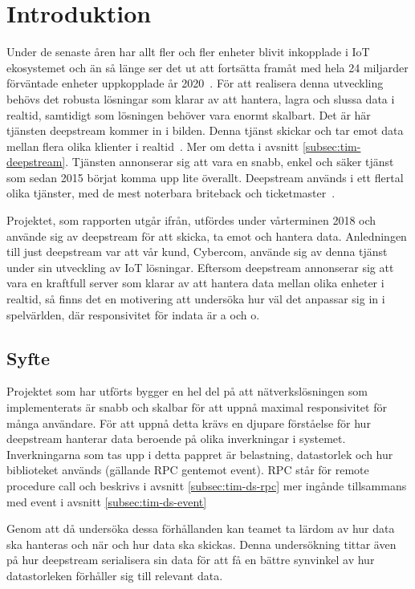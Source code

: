 \section{Introduktion}

Under de senaste åren har allt fler och fler enheter blivit inkopplade i IoT ekosystemet och än så länge ser det ut att fortsätta framåt med hela 24 miljarder förväntade enheter uppkopplade år 2020~\cite{IoT-ecosystem}. För att realisera denna utveckling behövs det robusta lösningar som klarar av att hantera, lagra och slussa data i realtid, samtidigt som lösningen behöver vara enormt skalbart. Det är här tjänsten deepstream kommer in i bilden. Denna tjänst skickar och tar emot data mellan flera olika klienter i realtid~\cite{deepstream}. Mer om detta i avsnitt \ref{subsec:tim-deepstream}. Tjänsten annonserar sig att vara en snabb, enkel och säker tjänst som sedan 2015 börjat komma upp lite överallt. Deepstream används i ett flertal olika tjänster, med de mest noterbara briteback och ticketmaster~\cite{ds-usecases}.

Projektet, som rapporten utgår ifrån, utfördes under vårterminen 2018 och använde sig av deepstream för att skicka, ta emot och hantera data. Anledningen till just deepstream var att vår kund, Cybercom, använde sig av denna tjänst under sin utveckling av IoT lösningar. Eftersom deepstream annonserar sig att vara en kraftfull server som klarar av att hantera data mellan olika enheter i realtid, så finns det en motivering att undersöka hur väl det anpassar sig in i spelvärlden, där responsivitet för indata är a och o.

\subsection{Syfte}
\label{subsec:tim-aim}
Projektet som har utförts bygger en hel del på att nätverkslösningen som implementerats är snabb och skalbar för att uppnå maximal responsivitet för många användare. För att uppnå detta krävs en djupare förståelse för hur deepstream hanterar data beroende på olika inverkningar i systemet. Inverkningarna som tas upp i detta pappret är belastning, datastorlek och hur biblioteket används (gällande RPC gentemot event). RPC står för remote procedure call och beskrivs i avsnitt \ref{subsec:tim-ds-rpc} mer ingånde tillsammans med event i avsnitt \ref{subsec:tim-ds-event}

Genom att då undersöka dessa förhållanden kan teamet ta lärdom av hur data ska hanteras och när och hur data ska skickas. Denna undersökning tittar även på hur deepstream serialisera sin data för att få en bättre synvinkel av hur datastorleken förhåller sig till relevant data.

